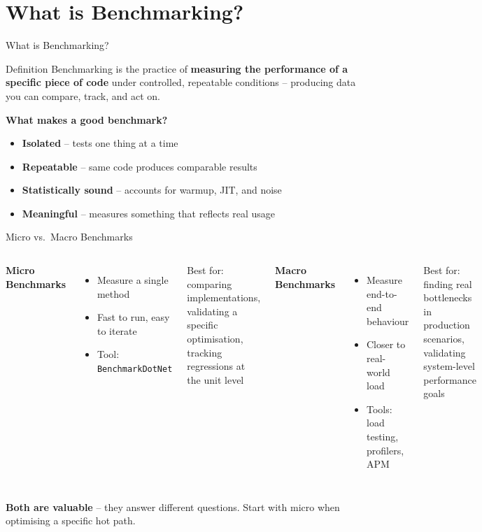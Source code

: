 \documentclass[aspectratio=1610, xcolor=table]{beamer}
\begin{document}
\section{What is Benchmarking?}

\begin{frame}{What is Benchmarking?}
	\begin{block}{Definition}
		Benchmarking is the practice of \textbf{measuring the performance of a
			specific piece of code} under controlled, repeatable conditions -- producing
		data you can compare, track, and act on.
	\end{block}

	\vspace{1em}
	\textbf{What makes a good benchmark?}
	\begin{itemize}
		\item \textbf{Isolated} -- tests one thing at a time
		\item \textbf{Repeatable} -- same code produces comparable results
		\item \textbf{Statistically sound} -- accounts for warmup, JIT, and noise
		\item \textbf{Meaningful} -- measures something that reflects real usage
	\end{itemize}
\end{frame}


\begin{frame}{Micro vs.\ Macro Benchmarks}
	\begin{columns}[T]
		\textbf{Micro Benchmarks}
		\begin{itemize}
			\item Measure a single method
			\item Fast to run, easy to iterate
			\item Tool: \texttt{BenchmarkDotNet}
		\end{itemize}
		\vspace{0.5em}
		{\small \textcolor{SecondaryAccent}{Best for:} comparing implementations,
			validating a specific optimisation, tracking regressions at the unit level}

		\textbf{Macro Benchmarks}
		\begin{itemize}
			\item Measure end-to-end behaviour
			\item Closer to real-world load
			\item Tools: load testing, profilers, APM
		\end{itemize}
		\vspace{0.5em}
		{\small \textcolor{SecondaryAccent}{Best for:} finding real bottlenecks in
			production scenarios, validating system-level performance goals}
	\end{columns}

	\vspace{1em}
	\textcolor{PrimaryAccent}{\textbf{Both are valuable}} -- they answer different questions.
	Start with micro when optimising a specific hot path.
\end{frame}
\end{document}
